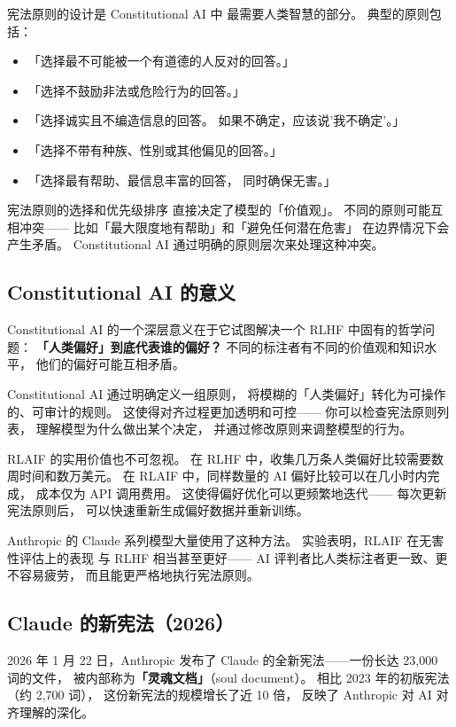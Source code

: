 宪法原则的设计是 Constitutional AI 中
最需要人类智慧的部分。
典型的原则包括：
\begin{itemize}[noitemsep]
  \item 「选择最不可能被一个有道德的人反对的回答。」
  \item 「选择不鼓励非法或危险行为的回答。」
  \item 「选择诚实且不编造信息的回答。
        如果不确定，应该说'我不确定'。」
  \item 「选择不带有种族、性别或其他偏见的回答。」
  \item 「选择最有帮助、最信息丰富的回答，
        同时确保无害。」
\end{itemize}

宪法原则的选择和优先级排序
直接决定了模型的「价值观」。
不同的原则可能互相冲突——
比如「最大限度地有帮助」和「避免任何潜在危害」
在边界情况下会产生矛盾。
Constitutional AI 通过明确的原则层次来处理这种冲突。

\subsection{Constitutional AI 的意义}

Constitutional AI 的一个深层意义在于它试图解决一个
RLHF 中固有的哲学问题：
\textbf{「人类偏好」到底代表谁的偏好？}
不同的标注者有不同的价值观和知识水平，
他们的偏好可能互相矛盾。

Constitutional AI 通过明确定义一组原则，
将模糊的「人类偏好」转化为可操作的、可审计的规则。
这使得对齐过程更加透明和可控——
你可以检查宪法原则列表，
理解模型为什么做出某个决定，
并通过修改原则来调整模型的行为。

RLAIF 的实用价值也不可忽视。
在 RLHF 中，收集几万条人类偏好比较需要数周时间和数万美元。
在 RLAIF 中，同样数量的 AI 偏好比较可以在几小时内完成，
成本仅为 API 调用费用。
这使得偏好优化可以更频繁地迭代——
每次更新宪法原则后，
可以快速重新生成偏好数据并重新训练。

Anthropic 的 Claude 系列模型大量使用了这种方法。
实验表明，RLAIF 在无害性评估上的表现
与 RLHF 相当甚至更好——
AI 评判者比人类标注者更一致、更不容易疲劳，
而且能更严格地执行宪法原则。

\subsection{Claude 的新宪法（2026）}

2026 年 1 月 22 日，Anthropic 发布了
Claude 的全新宪法——一份长达 23,000 词的文件，
被内部称为\textbf{「灵魂文档」}（soul document）。
相比 2023 年的初版宪法（约 2,700 词），
这份新宪法的规模增长了近 10 倍，
反映了 Anthropic 对 AI 对齐理解的深化。

